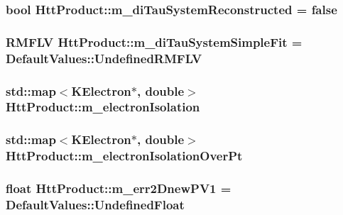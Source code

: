 \label{classHttProduct_a1a670963cdd4350b7abc851b0b69366e}
\hypertarget{classHttProduct_a74732bcc7098f15e0bcca4c01e5738f9}{
\subsubsection[{m\_\-diTauSystemReconstructed}]{\setlength{\rightskip}{0pt plus 5cm}bool {\bf HttProduct::m\_\-diTauSystemReconstructed} = false}}
\label{classHttProduct_a74732bcc7098f15e0bcca4c01e5738f9}
\hypertarget{classHttProduct_a71add7604b6cd190216b8f32420d27aa}{
\subsubsection[{m\_\-diTauSystemSimpleFit}]{\setlength{\rightskip}{0pt plus 5cm}RMFLV {\bf HttProduct::m\_\-diTauSystemSimpleFit} = DefaultValues::UndefinedRMFLV}}
\label{classHttProduct_a71add7604b6cd190216b8f32420d27aa}
\hypertarget{classHttProduct_a29ffba30f2e0e486ebe1f6267461d0a8}{
\subsubsection[{m\_\-electronIsolation}]{\setlength{\rightskip}{0pt plus 5cm}std::map$<$KElectron$\ast$, double$>$ {\bf HttProduct::m\_\-electronIsolation}}}
\label{classHttProduct_a29ffba30f2e0e486ebe1f6267461d0a8}
\hypertarget{classHttProduct_a8f5dd10373ad2d502aea2f9ad4446cee}{
\subsubsection[{m\_\-electronIsolationOverPt}]{\setlength{\rightskip}{0pt plus 5cm}std::map$<$KElectron$\ast$, double$>$ {\bf HttProduct::m\_\-electronIsolationOverPt}}}
\label{classHttProduct_a8f5dd10373ad2d502aea2f9ad4446cee}
\hypertarget{classHttProduct_ac4058691f0eab33136a5fcfd728e8e96}{
\subsubsection[{m\_\-err2DnewPV1}]{\setlength{\rightskip}{0pt plus 5cm}float {\bf HttProduct::m\_\-err2DnewPV1} = DefaultValues::UndefinedFloat}}

